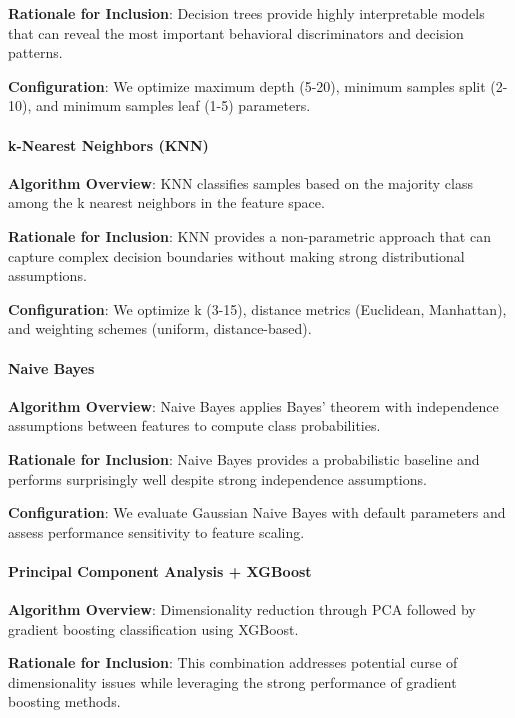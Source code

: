\documentclass[
  11pt,
  a4paper,
]{article}
\begin{document}
\textbf{Rationale for Inclusion}: Decision trees provide highly
interpretable models that can reveal the most important behavioral
discriminators and decision patterns.

\textbf{Configuration}: We optimize maximum depth (5-20), minimum
samples split (2-10), and minimum samples leaf (1-5) parameters.

\paragraph{k-Nearest Neighbors (KNN)}\label{k-nearest-neighbors-knn}

\textbf{Algorithm Overview}: KNN classifies samples based on the
majority class among the k nearest neighbors in the feature space.

\textbf{Rationale for Inclusion}: KNN provides a non-parametric approach
that can capture complex decision boundaries without making strong
distributional assumptions.

\textbf{Configuration}: We optimize k (3-15), distance metrics
(Euclidean, Manhattan), and weighting schemes (uniform, distance-based).

\paragraph{Naive Bayes}\label{naive-bayes}

\textbf{Algorithm Overview}: Naive Bayes applies Bayes' theorem with
independence assumptions between features to compute class
probabilities.

\textbf{Rationale for Inclusion}: Naive Bayes provides a probabilistic
baseline and performs surprisingly well despite strong independence
assumptions.

\textbf{Configuration}: We evaluate Gaussian Naive Bayes with default
parameters and assess performance sensitivity to feature scaling.

\paragraph{Principal Component Analysis +
XGBoost}\label{principal-component-analysis-xgboost}

\textbf{Algorithm Overview}: Dimensionality reduction through PCA
followed by gradient boosting classification using XGBoost.

\textbf{Rationale for Inclusion}: This combination addresses potential
curse of dimensionality issues while leveraging the strong performance
of gradient boosting methods.
\end{document}
